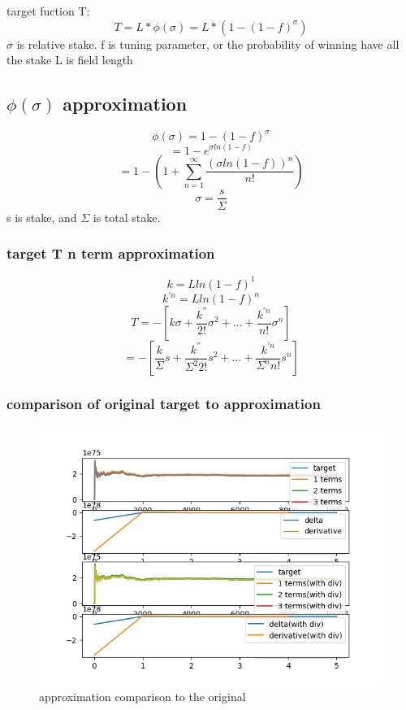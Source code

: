 \documentclass{article}
\begin{document}
 target fuction T: $$ T = L * \phi(\sigma) = L * (1- (1 - f)^{\sigma}) $$
 $\sigma$ is relative stake.
 f is tuning parameter, or the probability of winning have all the stake
 L is field length

\subsection{ $\phi(\sigma)$ approximation}

 $$\phi(\sigma) = 1 - (1-f)^{\sigma} $$
 $$ = 1 - e^{\sigma ln(1-f)} $$
 $$ = 1 - (1 + \sum_{n=1}^{\infty}\frac{(\sigma ln (1-f))^n}{n!}) $$
 $$ \sigma = \frac{s}{\Sigma} $$
 s is stake, and $\Sigma$ is total stake.

\subsubsection{ target T n term approximation}

 $$ k = L ln (1-f)^1 $$
 $$ k^{'n} =  L ln (1-f)^n $$
 $$ T = -[k\sigma + \frac{k^{''}}{2!} \sigma^2 + \dots +\frac{ k^{'n}}{n!}\sigma^n] $$
 $$  = -[\frac{k}{\Sigma}s + \frac{k^{''}}{\Sigma^2 2!} s^2 + \dots +\frac{k^{'n}}{\Sigma^n n!} s^n] $$

\subsubsection{ comparison of original target to approximation }

\begin{figure}
  \includegraphics{target.png}
  \caption{approximation comparison to the original }
\end{figure}
\end{document}
